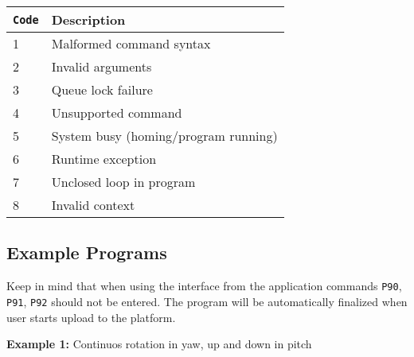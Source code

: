 \begin{tabular}{ll}
  \hline
  \texttt{Code} & Description                          \\
  \hline
  1             & Malformed command syntax             \\
  2             & Invalid arguments                    \\
  3             & Queue lock failure                   \\
  4             & Unsupported command                  \\
  5             & System busy (homing/program running) \\
  6             & Runtime exception                    \\
  7             & Unclosed loop in program             \\
  8             & Invalid context                      \\
  \hline
\end{tabular}


\subsection*{Example Programs}

Keep in mind that when using the interface from the application commands \texttt{P90}, \texttt{P91}, \texttt{P92} should not be entered. The program will be automatically finalized when user starts upload to the platform.

\vspace{0.3cm}
\noindent
\textbf{Example 1:} Continuos rotation in yaw, up and down in pitch

